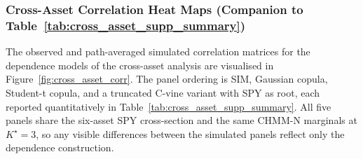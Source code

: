 \subsubsection{Cross-Asset Correlation Heat Maps (Companion to Table~\ref{tab:cross_asset_supp_summary})}
\label{sec:cross_asset_corr_supp}

The observed and path-averaged simulated correlation matrices for the dependence models of the cross-asset analysis are visualised in Figure~\ref{fig:cross_asset_corr}.
The panel ordering is SIM, Gaussian copula, Student-t copula, and a truncated C-vine variant with SPY as root, each reported quantitatively in Table~\ref{tab:cross_asset_supp_summary}.
All five panels share the six-asset SPY cross-section and the same CHMM-N marginals at $K^\star = 3$, so any visible differences between the simulated panels reflect only the dependence construction.

